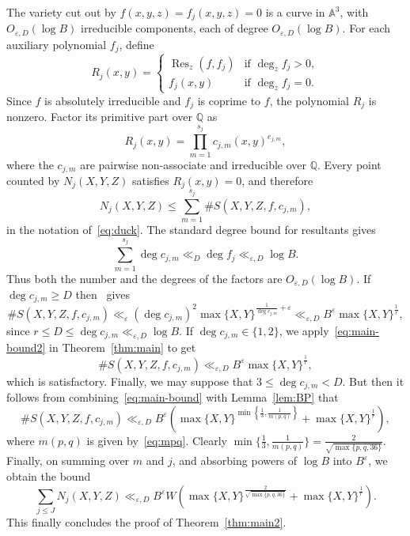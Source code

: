 \documentclass[a4paper,11pt,twoside,reqno]{amsart}
\theoremstyle{definition}
\theoremstyle{remark}
\numberwithin{equation}{section}
\newcommand\ve{\varepsilon}
\newcommand\QQ{\mathbb{Q}}
\newcommand\1{\mathbf{1}}
\DeclareMathOperator\Res{Res}
\renewcommand{\leq}{\leqslant}
\renewcommand{\geq}{\geqslant}
\begin{document}
The variety cut out by $f(x,y,z)=f_j(x,y,z)=0$ is a curve in $\mathbb{A}^3$, with $O_{\ve,D}(\log B)$ irreducible components, each of degree $O_{\ve,D}(\log B)$.
For each auxiliary polynomial $f_j$, define 
\[ 
R_j(x,y)= \begin{cases} \Res_z(f,f_j) & \text{if $\deg_z f_j>0$},\\ 
f_j(x,y) & \text{if $\deg_z f_j=0$}. 
\end{cases} 
\] 
Since $f$ is absolutely irreducible and $f_j$ is coprime to $f$, the polynomial $R_j$ is nonzero. Factor its primitive part over $\QQ$ as 
\[ 
R_j(x,y)=\prod_{m=1}^{s_j}c_{j,m}(x,y)^{e_{j,m}}, 
\] 
where the $c_{j,m}$ are pairwise non-associate and irreducible over $\QQ$. 
Every point counted by $N_j(X,Y,Z)$ satisfies $R_j(x,y)=0$, and therefore 
\[ 
N_j(X,Y,Z) \leq \sum_{m=1}^{s_j} \#S(X,Y,Z,f,c_{j,m}),
\] 
in the notation of~\eqref{eq:duck}.
The standard degree bound for resultants gives 
\[ 
\sum_{m=1}^{s_j}\deg c_{j,m} \ll_D \deg f_j \ll_{\varepsilon,D}\log B. 
\] 
Thus both the number and the degrees of the factors are $O_{\varepsilon,D}(\log B)$. 
If $\deg c_{j,m}\geq D$
 then~\cite[Theorem~2]{bincluck} gives 
\[ 
\#S(X,Y,Z,f,c_{j,m})
\ll_\ve (\deg c_{j,m})^2 \max\{X,Y\}^{\frac{1}{\deg c_{j,m}}+\ve} \ll_{\ve,D}
B^\varepsilon\max\{X,Y\}^{\frac{1}{r}}, 
\] 
since $r\leq D\leq \deg c_{j,m}\ll_{\ve,D} \log B$. 
If $\deg c_{j,m}\in \{1,2\}$, 
we apply~\eqref{eq:main-bound2} in Theorem~\ref{thm:main} to get
\[
\#S(X,Y,Z,f,c_{j,m})\ll_{\ve,D}B^{\ve}\max\{X,Y\}^{\frac{1}{r}},
\]
which is satisfactory. Finally, we may suppose that 
 $3\leq \deg c_{j,m}< D$. But then it follows from 
combining~\eqref{eq:main-bound} with 
 Lemma~\ref{lem:BP} that 
 \[
\#S(X,Y,Z,f,c_{j,m})\ll_{\ve,D} B^{\ve}\left(\max\{X,Y\}^{\min\left\{\frac{1}{3},\frac{1}{m(p,q)}\right\}}+\max\{X,Y\}^{\frac{1}{r}}\right),
\]
where $m(p,q)$ is given by~\eqref{eq:mpq}.
Clearly $\min\{\frac{1}{3},\frac{1}{m(p,q)}\}=\frac{2}{\sqrt{\max\{p,q,36\}}}$. 
Finally, on summing over $m$ and $j$, and absorbing powers of $\log B$ into 
$B^\varepsilon$, we obtain the bound 
\[ 
\sum_{j\leq J}N_j(X,Y,Z) \ll_{\varepsilon,D} B^\varepsilon W \left( \max\{X,Y\}^{\frac{2}{
\sqrt{\max\{p,q,36\}}}}
+ \max\{X,Y\}^{\frac{1}{r}} \right). 
\] 
This finally concludes the proof of Theorem~\ref{thm:main2}.
\end{document}
